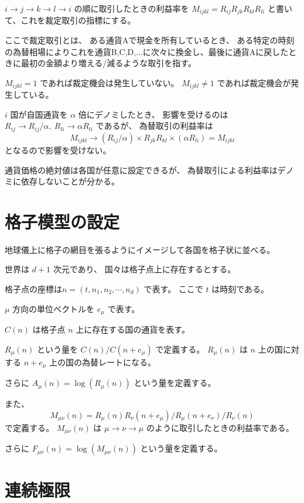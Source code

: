 \documentclass[uplatex]{jsarticle}
\begin{document}
$i \to j \to k \to l \to i$
の順に取引したときの利益率を
$M_{ijkl} = R_{ij} R_{jk} R_{kl} R_{li}$
と書いて、これを裁定取引の指標にする。

ここで裁定取引とは、
ある通貨Aで現金を所有しているとき、
ある特定の時刻の為替相場によりこれを通貨B,C,D,...に次々に換金し、最後に通貨Aに戻したときに最初の金額より増える/減るような取引を指す。

$M_{ijkl}=1$ であれば裁定機会は発生していない。
$M_{ijkl} \neq 1$ であれば裁定機会が発生している。

$i$ 国が自国通貨を $\alpha$ 倍にデノミしたとき、
影響を受けるのは
$R_{ij} \to R_{ij} / \alpha , \ R_{li} \to \alpha R_{li}$
であるが、
為替取引の利益率は
$$
	M_{ijkl} \to (R_{ij} / \alpha) \times R_{jk} R_{kl} \times (\alpha R_{li}) = M_{ijkl}
$$
となるので影響を受けない。

通貨価格の絶対値は各国が任意に設定できるが、
為替取引による利益率はデノミに依存しないことが分かる。




\section{格子模型の設定}

地球儀上に格子の網目を張るようにイメージして各国を格子状に並べる。

世界は $d+1$ 次元であり、
国々は格子点上に存在するとする。

格子点の座標は$ n = (t, n_{1},n_{2}, \cdots, n_{d})$
で表す。
ここで $t$ は時刻である。

$\mu$ 方向の単位ベクトルを $e_{\mu}$ で表す。

$C(n)$ は格子点 $n$ 上に存在する国の通貨を表す。

$R_{\mu}(n)$ という量を $C(n) / C(n + e_{\mu})$
で定義する。
$R_{\mu}(n)$ は $n$ 上の国に対する $n + e_{\mu}$ 上の国の為替レートになる。

さらに
$A_{\mu}(n) = \log (R_{\mu}(n))$
という量を定義する。

また、
$$
	M_{\mu \nu}(n)
	=
	R_{\mu}(n) R_{\nu}(n+e_{\mu})
	/ R_{\mu}(n+e_{\nu})
	/ R_{\nu}(n)
$$
で定義する。
$M_{\mu \nu}(n)$ は $\mu \to \nu \to \mu$ のように取引したときの利益率である。

さらに
$F_{\mu \nu}(n) = \log (M_{\mu \nu}(n))$
という量を定義する。




\section{連続極限}
\end{document}
